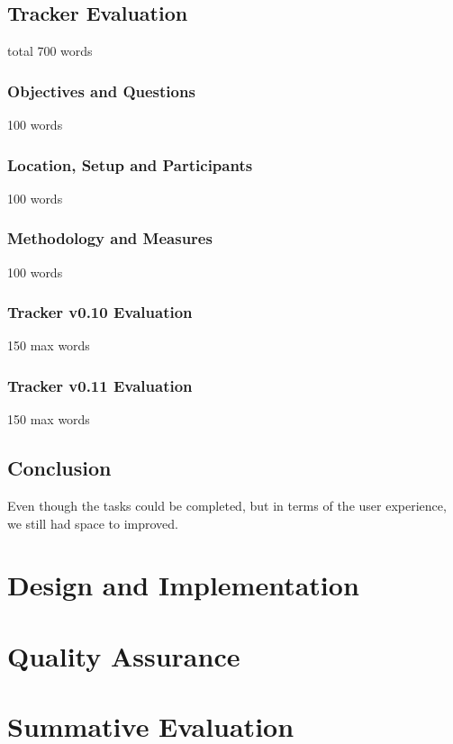 \documentclass[12pt,a4paper]{article}
\begin{document}
        \subsection{Tracker Evaluation}
            total 700 words
          \subsubsection{Objectives and Questions}
            100 words
          \subsubsection{Location, Setup and Participants}
            100 words
          \subsubsection{Methodology and Measures}
            100 words
          \subsubsection{Tracker v0.10 Evaluation}
            150 max words
          \subsubsection{Tracker v0.11 Evaluation}
            150 max words
        \subsection{Conclusion}
          Even though the tasks could be completed, but in terms of the user experience, we still had space to improved. 
      \newpage
    \section{Design and Implementation}
    \section{Quality Assurance}
    \section{Summative Evaluation}
    
\end{document}

